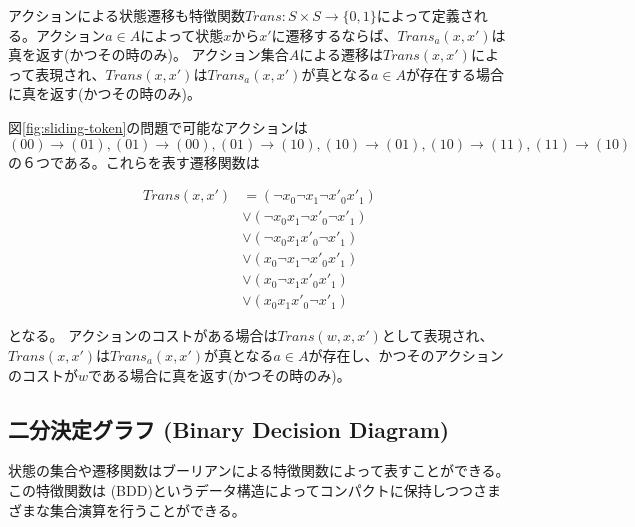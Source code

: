 
アクションによる状態遷移も特徴関数$Trans: S \times S \rightarrow \{0, 1\}$によって定義される。アクション$a \in A$によって状態$x$から$x'$に遷移するならば、$Trans_a(x,x')$は真を返す(かつその時のみ)。
アクション集合$A$による遷移は$Trans(x,x')$によって表現され、$Trans(x,x')$は$Trans_a(x,x')$が真となる$a \in A$が存在する場合に真を返す(かつその時のみ)。

図\ref{fig:sliding-token}の問題で可能なアクションは$(00) \rightarrow (01), (01) \rightarrow (00), (01) \rightarrow (10), (10) \rightarrow (01), (10) \rightarrow (11), (11) \rightarrow (10)$の６つである。これらを表す遷移関数は

\begin{equation}
\begin{split}
	Trans(x,x') &= (\lnot x_0 \lnot x_1 \lnot x'_0 x'_1) \\
		&\lor (\lnot x_0 x_1 \lnot x'_0 \lnot x'_1) \\
		&\lor (\lnot x_0 x_1 x'_0 \lnot x'_1) \\
		&\lor (x_0 \lnot x_1 \lnot x'_0 x'_1) \\
		&\lor (x_0 \lnot x_1 x'_0 x'_1) \\
		&\lor (x_0 x_1 x'_0 \lnot x'_1)
\end{split}
\end{equation}

となる。
アクションのコストがある場合は$Trans(w, x, x')$として表現され、$Trans(x,x')$は$Trans_a(x,x')$が真となる$a \in A$が存在し、かつそのアクションのコストが$w$である場合に真を返す(かつその時のみ)。


\subsection{二分決定グラフ (Binary Decision Diagram)}
\label{sec:binary-decision-diagram}

状態の集合や遷移関数はブーリアンによる特徴関数によって表すことができる。
この特徴関数は (BDD)というデータ構造によってコンパクトに保持しつつさまざまな集合演算を行うことができる。


